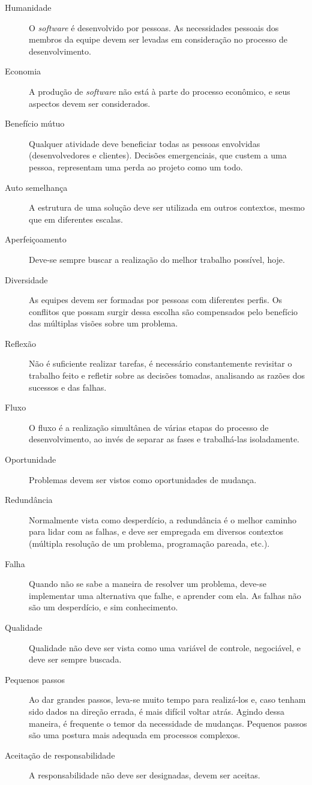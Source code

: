     \begin{description}
      \item[Humanidade]
	      O \textit{software} é desenvolvido por pessoas. As necessidades pessoais dos membros da equipe devem ser levadas em consideração no processo de desenvolvimento.
      \item[Economia]
        A produção de \textit{software} não está à parte do processo econômico, e seus aspectos devem ser considerados.
      \item[Benefício mútuo]
        Qualquer atividade deve beneficiar todas as pessoas envolvidas (desenvolvedores e clientes). Decisões emergenciais, que custem a uma pessoa, representam uma perda ao projeto como um todo.
      \item[Auto semelhança]
        A estrutura de uma solução deve ser utilizada em outros contextos, mesmo que em diferentes escalas.
      \item[Aperfeiçoamento]
        Deve-se sempre buscar a realização do melhor trabalho possível, hoje.
      \item[Diversidade]
        As equipes devem ser formadas por pessoas com diferentes perfis. Os conflitos que possam surgir dessa escolha são compensados pelo benefício das múltiplas visões sobre um problema.
      \item[Reflexão]
        Não é suficiente realizar tarefas, é necessário constantemente revisitar o trabalho feito e refletir sobre as decisões tomadas, analisando as razões dos sucessos e das falhas.
      \item[Fluxo]
        O fluxo é a realização simultânea de várias etapas do processo de desenvolvimento, ao invés de separar as fases e trabalhá-las isoladamente.
      \item[Oportunidade]
        Problemas devem ser vistos como oportunidades de mudança.
      \item[Redundância]
        Normalmente vista como desperdício, a redundância é o melhor caminho para lidar com as falhas, e deve ser empregada em diversos contextos (múltipla resolução de um problema, programação pareada, etc.).
      \item[Falha]
        Quando não se sabe a maneira de resolver um problema, deve-se implementar uma alternativa que falhe, e aprender com ela. As falhas não são um desperdício, e sim conhecimento.
      \item[Qualidade]
        Qualidade não deve ser vista como uma variável de controle, negociável, e deve ser sempre buscada.
      \item[Pequenos passos]
        Ao dar grandes passos, leva-se muito tempo para realizá-los e, caso tenham sido dados na direção errada, é mais difícil voltar atrás. Agindo dessa maneira, é frequente o temor da necessidade de mudanças. Pequenos passos são uma postura mais adequada em processos complexos.
      \item[Aceitação de responsabilidade]
        A responsabilidade não deve ser designadas, devem ser aceitas.
    \end{description}

